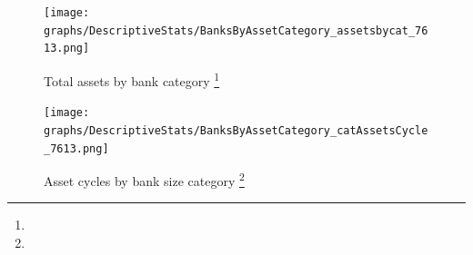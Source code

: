 \documentclass[12pt, a4paper]{article} %
\begin{document}

\begin{figure}[H]
\begin{minipage}{\textwidth}
\centering
\caption[1]{Total assets by bank category \footnote{} }
\texttt{[image: graphs/DescriptiveStats/BanksByAssetCategory\_assetsbycat\_7613.png]}
\label{fig:assetsbycat}
\end{minipage}
\end{figure}

\begin{figure}[H]
\begin{minipage}{\textwidth}
\centering
\caption[1]{Asset cycles by bank size category \footnote{} }
\texttt{[image: graphs/DescriptiveStats/BanksByAssetCategory\_catAssetsCycle\_7613.png]}
\label{fig:catassetscycle}
\end{minipage}
\end{figure}
\end{document}
